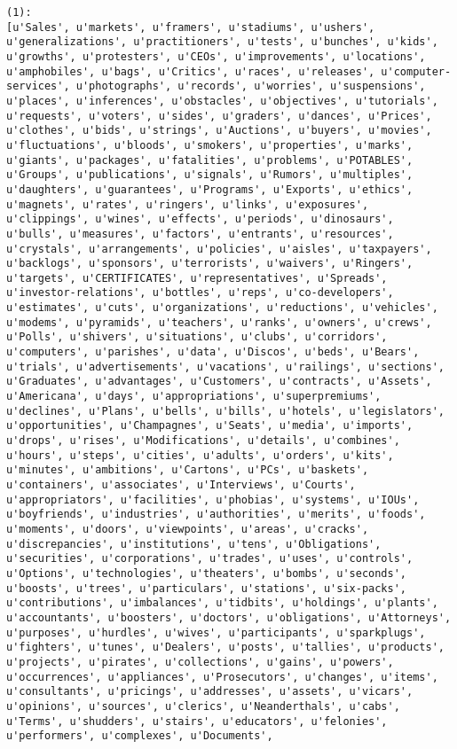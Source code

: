 \documentclass{article}
\begin{document}
    \begin{Verbatim}[commandchars=\\\{\}]
(1):
[u'Sales', u'markets', u'framers', u'stadiums', u'ushers', u'generalizations', u'practitioners', u'tests', u'bunches', u'kids', u'growths', u'protesters', u'CEOs', u'improvements', u'locations', u'amphobiles', u'bags', u'Critics', u'races', u'releases', u'computer-services', u'photographs', u'records', u'worries', u'suspensions', u'places', u'inferences', u'obstacles', u'objectives', u'tutorials', u'requests', u'voters', u'sides', u'graders', u'dances', u'Prices', u'clothes', u'bids', u'strings', u'Auctions', u'buyers', u'movies', u'fluctuations', u'bloods', u'smokers', u'properties', u'marks', u'giants', u'packages', u'fatalities', u'problems', u'POTABLES', u'Groups', u'publications', u'signals', u'Rumors', u'multiples', u'daughters', u'guarantees', u'Programs', u'Exports', u'ethics', u'magnets', u'rates', u'ringers', u'links', u'exposures', u'clippings', u'wines', u'effects', u'periods', u'dinosaurs', u'bulls', u'measures', u'factors', u'entrants', u'resources', u'crystals', u'arrangements', u'policies', u'aisles', u'taxpayers', u'backlogs', u'sponsors', u'terrorists', u'waivers', u'Ringers', u'targets', u'CERTIFICATES', u'representatives', u'Spreads', u'investor-relations', u'bottles', u'reps', u'co-developers', u'estimates', u'cuts', u'organizations', u'reductions', u'vehicles', u'modems', u'pyramids', u'teachers', u'ranks', u'owners', u'crews', u'Polls', u'shivers', u'situations', u'clubs', u'corridors', u'computers', u'parishes', u'data', u'Discos', u'beds', u'Bears', u'trials', u'advertisements', u'vacations', u'railings', u'sections', u'Graduates', u'advantages', u'Customers', u'contracts', u'Assets', u'Americana', u'days', u'appropriations', u'superpremiums', u'declines', u'Plans', u'bells', u'bills', u'hotels', u'legislators', u'opportunities', u'Champagnes', u'Seats', u'media', u'imports', u'drops', u'rises', u'Modifications', u'details', u'combines', u'hours', u'steps', u'cities', u'adults', u'orders', u'kits', u'minutes', u'ambitions', u'Cartons', u'PCs', u'baskets', u'containers', u'associates', u'Interviews', u'Courts', u'appropriators', u'facilities', u'phobias', u'systems', u'IOUs', u'boyfriends', u'industries', u'authorities', u'merits', u'foods', u'moments', u'doors', u'viewpoints', u'areas', u'cracks', u'discrepancies', u'institutions', u'tens', u'Obligations', u'securities', u'corporations', u'trades', u'uses', u'controls', u'Options', u'technologies', u'theaters', u'bombs', u'seconds', u'boosts', u'trees', u'particulars', u'stations', u'six-packs', u'contributions', u'imbalances', u'tidbits', u'holdings', u'plants', u'accountants', u'boosters', u'doctors', u'obligations', u'Attorneys', u'purposes', u'hurdles', u'wives', u'participants', u'sparkplugs', u'fighters', u'tunes', u'Dealers', u'posts', u'tallies', u'products', u'projects', u'pirates', u'collections', u'gains', u'powers', u'occurrences', u'appliances', u'Prosecutors', u'changes', u'items', u'consultants', u'pricings', u'addresses', u'assets', u'vicars', u'opinions', u'sources', u'clerics', u'Neanderthals', u'cabs', u'Terms', u'shudders', u'stairs', u'educators', u'felonies', u'performers', u'complexes', u'Documents', 
\end{Verbatim}
\end{document}
